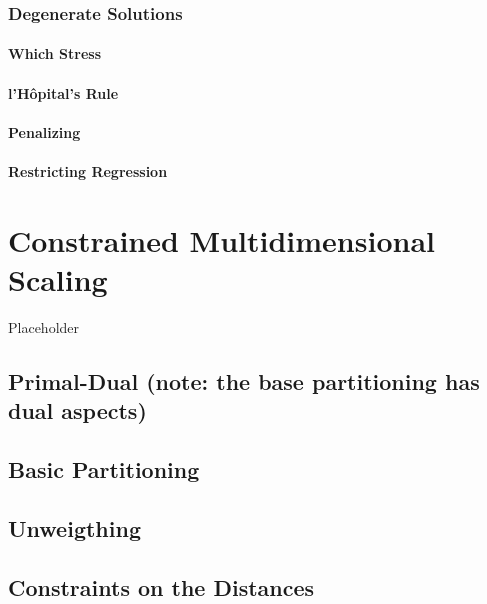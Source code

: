 \documentclass[
  12pt,
]{book}
\begin{document}
\subsection{Degenerate Solutions}\label{unfdegenerate}

\subsubsection{Which Stress}\label{which-stress}

\subsubsection{l'Hôpital's Rule}\label{hopital}

\subsubsection{Penalizing}\label{penalizing}

\subsubsection{Restricting Regression}\label{restricting-regression}

\chapter{Constrained Multidimensional Scaling}\label{cmds}

Placeholder

\section{Primal-Dual (note: the base partitioning has dual aspects)}\label{primal-dual-note-the-base-partitioning-has-dual-aspects}

\section{Basic Partitioning}\label{baspar}

\section{Unweigthing}\label{majawa}

\section{Constraints on the Distances}\label{constraints-on-the-distances}
\end{document}
